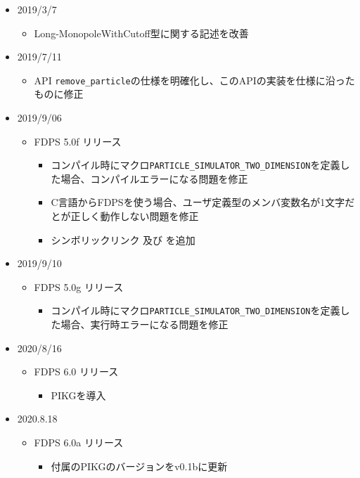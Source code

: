 \begin{itemize}[leftmargin=*,itemsep=-1ex]
\item 2019/3/7
\begin{itemize}
\item Long-MonopoleWithCutoff型に関する記述を改善
\end{itemize}

\item 2019/7/11
\begin{itemize}
\item API \texttt{remove\_particle}の仕様を明確化し、このAPIの実装を仕様に沿ったものに修正
\end{itemize}

\item 2019/9/06
\begin{itemize}
\item FDPS 5.0f リリース
\begin{itemize}
\item コンパイル時にマクロ\texttt{PARTICLE\_SIMULATOR\_TWO\_DIMENSION}を定義した場合、コンパイルエラーになる問題を修正
\item C言語からFDPSを使う場合、ユーザ定義型のメンバ変数名が1文字だとが正しく動作しない問題を修正
\item シンボリックリンク  及び  を追加
\end{itemize}
\end{itemize}

\item 2019/9/10
\begin{itemize}
\item FDPS 5.0g リリース
\begin{itemize}
\item コンパイル時にマクロ\texttt{PARTICLE\_SIMULATOR\_TWO\_DIMENSION}を定義した場合、実行時エラーになる問題を修正
\end{itemize}
\end{itemize}


\item 2020/8/16
\begin{itemize}
\item FDPS 6.0 リリース
\begin{itemize}
\item PIKGを導入
\end{itemize}
\end{itemize}

\item 2020.8.18
\begin{itemize}
\item FDPS 6.0a リリース
\begin{itemize}
\item 付属のPIKGのバージョンをv0.1bに更新
\end{itemize}
\end{itemize}


\end{itemize}
